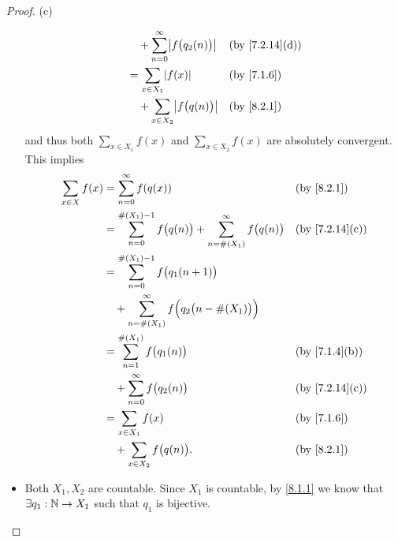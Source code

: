 \begin{proof}{(c)}
\begin{itemize}
\begin{align*}
                                      & \quad + \sum_{n = 0}^\infty \abs{f\big(q_2(n)\big)}                                                  &  & \text{(by \cref{7.2.14}(d))} \\
                                      & = \sum_{x \in X_1} \abs{f(x)}                                                                        &  & \by{7.1.6}                   \\
                                      & \quad + \sum_{x \in X_2} \abs{f\big(q(n)\big)}                                                       &  & \by{8.2.1}
          \end{align*}
          and thus both \(\sum_{x \in X_1} f(x)\) and \(\sum_{x \in X_2} f(x)\) are absolutely convergent.
          This implies
          \begin{align*}
            \sum_{x \in X} f(x) & = \sum_{n = 0}^\infty f(q(x))                                                            &  & \by{8.2.1}                   \\
                                & = \sum_{n = 0}^{\#(X_1) - 1} f\big(q(n)\big) + \sum_{n = \#(X_1)}^\infty f\big(q(n)\big) &  & \text{(by \cref{7.2.14}(c))} \\
                                & = \sum_{n = 0}^{\#(X_1) - 1} f\big(q_1(n + 1)\big)                                                                         \\
                                & \quad + \sum_{n = \#(X_1)}^\infty f\Big(q_2\big(n - \#(X_1)\big)\Big)                                                      \\
                                & = \sum_{n = 1}^{\#(X_1)} f\big(q_1(n)\big)                                               &  & \text{(by \cref{7.1.4}(b))}  \\
                                & \quad + \sum_{n = 0}^\infty f\big(q_2(n)\big)                                            &  & \text{(by \cref{7.2.14}(c))} \\
                                & = \sum_{x \in X_1} f(x)                                                                  &  & \by{7.1.6}                   \\
                                & \quad + \sum_{x \in X_2} f\big(q(n)\big).                                                &  & \by{8.2.1}
          \end{align*}
    \item Both \(X_1, X_2\) are countable.
          Since \(X_1\) is countable, by \cref{8.1.1} we know that \(\exists q_1 : \mathbb{N} \to X_1\) such that \(q_1\) is bijective.

\end{itemize}
\end{proof}
